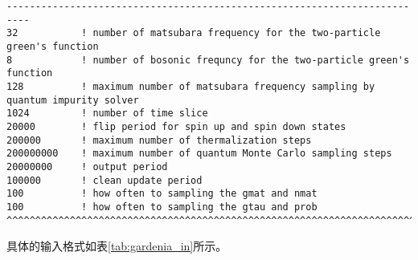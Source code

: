 \begin{lstlisting}[frame=single]
--------------------------------------------------------------------------
32           ! number of matsubara frequency for the two-particle green's function
8            ! number of bosonic frequncy for the two-particle green's function
128          ! maximum number of matsubara frequency sampling by quantum impurity solver
1024         ! number of time slice
20000        ! flip period for spin up and spin down states
200000       ! maximum number of thermalization steps
200000000    ! maximum number of quantum Monte Carlo sampling steps
20000000     ! output period
100000       ! clean update period
100          ! how often to sampling the gmat and nmat
100          ! how often to sampling the gtau and prob
^^^^^^^^^^^^^^^^^^^^^^^^^^^^^^^^^^^^^^^^^^^^^^^^^^^^^^^^^^^^^^^^^^^^^^^^^^
\end{lstlisting}

具体的输入格式如表\ref{tab:gardenia_in}所示。

